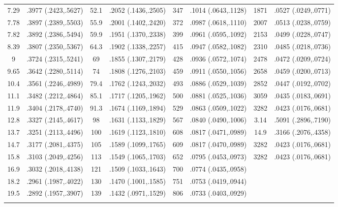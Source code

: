 \begin{longtable}{cccccccc}
  7.29 & .3977 (.2423,.5627) & 52.1 & .2052 (.1436,.2505) & 347 & .1014 (.0643,.1128) & 1871 & .0527 (.0249,.0771) \\ 
  7.78 & .3897 (.2389,.5503) & 55.9 & .2001 (.1402,.2420) & 372 & .0987 (.0618,.1110) & 2007 & .0513 (.0238,.0759) \\ 
  7.82 & .3892 (.2386,.5494) & 59.9 & .1951 (.1370,.2338) & 399 & .0961 (.0595,.1092) & 2153 & .0499 (.0228,.0747) \\ 
  8.39 & .3807 (.2350,.5367) & 64.3 & .1902 (.1338,.2257) & 415 & .0947 (.0582,.1082) & 2310 & .0485 (.0218,.0736) \\ 
  9 & .3724 (.2315,.5241) & 69 & .1855 (.1307,.2179) & 428 & .0936 (.0572,.1074) & 2478 & .0472 (.0209,.0724) \\ 
  9.65 & .3642 (.2280,.5114) & 74 & .1808 (.1276,.2103) & 459 & .0911 (.0550,.1056) & 2658 & .0459 (.0200,.0713) \\ 
  10.4 & .3561 (.2246,.4989) & 79.4 & .1762 (.1243,.2032) & 493 & .0886 (.0529,.1039) & 2852 & .0447 (.0192,.0702) \\ 
  11.1 & .3482 (.2212,.4864) & 85.1 & .1717 (.1205,.1962) & 500 & .0881 (.0525,.1036) & 3059 & .0435 (.0183,.0691) \\ 
  11.9 & .3404 (.2178,.4740) & 91.3 & .1674 (.1169,.1894) & 529 & .0863 (.0509,.1022) & 3282 & .0423 (.0176,.0681) \\ 
  12.8 & .3327 (.2145,.4617) & 98 & .1631 (.1133,.1829) & 567 & .0840 (.0490,.1006) & 3.14 & .5091 (.2896,.7190) \\ 
  13.7 & .3251 (.2113,.4496) & 100 & .1619 (.1123,.1810) & 608 & .0817 (.0471,.0989) & 14.9 & .3166 (.2076,.4358) \\ 
  14.7 & .3177 (.2081,.4375) & 105 & .1589 (.1099,.1765) & 609 & .0817 (.0470,.0989) & 3282 & .0423 (.0176,.0681) \\ 
  15.8 & .3103 (.2049,.4256) & 113 & .1549 (.1065,.1703) & 652 & .0795 (.0453,.0973) & 3282 & .0423 (.0176,.0681) \\ 
  16.9 & .3032 (.2018,.4138) & 121 & .1509 (.1033,.1643) & 700 & .0774 (.0435,.0958) &  &  \\ 
  18.2 & .2961 (.1987,.4022) & 130 & .1470 (.1001,.1585) & 751 & .0753 (.0419,.0944) &  &  \\ 
  19.5 & .2892 (.1957,.3907) & 139 & .1432 (.0971,.1529) & 806 & .0733 (.0403,.0929) &  &  \\ 
   \hline
\hline
\label{tab marginalized_risks_eq 2}
\end{longtable}

